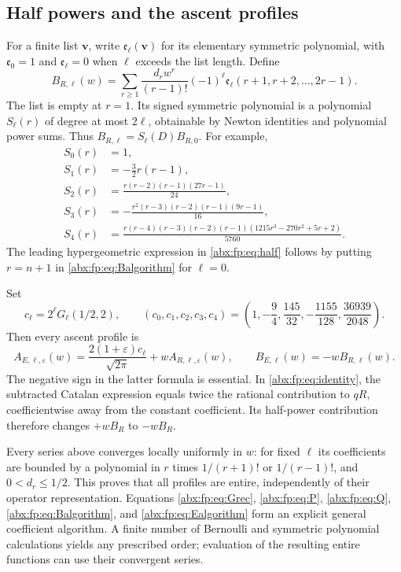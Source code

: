 \documentclass[11pt,letterpaper]{article}
\numberwithin{equation}{section}
\theoremstyle{remark}\newtheorem{remark}[theorem]{Remark}
\newcommand{\eps}{\varepsilon}
\newcommand{\sq}{\sqrt{2\pi}}
\begin{document}
\subsection{Half powers and the ascent profiles}\label{abx:fp:sub:half}
For a finite list $\boldsymbol v$, write $\mathfrak e_\ell(\boldsymbol v)$
for its elementary symmetric polynomial, with $\mathfrak e_0=1$ and
$\mathfrak e_\ell=0$ when $\ell$ exceeds the list length. Define
\begin{equation}\label{abx:fp:eq:Balgorithm}
 B_{R,\ell}(w)=\sum_{r\ge1}\frac{d_rw^r}{(r-1)!}
       (-1)^\ell\mathfrak e_\ell(r+1,r+2,\ldots,2r-1).
\end{equation}
The list is empty at $r=1$. Its signed symmetric polynomial is a
polynomial $S_\ell(r)$ of degree at most $2\ell$, obtainable by
Newton identities and polynomial power sums. Thus
$B_{R,\ell}=S_\ell(D)B_{R,0}$. For example,
\begin{align*}
 S_0(r)&=1,\\
 S_1(r)&=-\frac32r(r-1),\\
 S_2(r)&=\frac{r(r-2)(r-1)(27r-1)}{24},\\
 S_3(r)&=-\frac{r^2(r-3)(r-2)(r-1)(9r-1)}{16},\\
 S_4(r)&=\frac{r(r-4)(r-3)(r-2)(r-1)
                  (1215r^3-270r^2+5r+2)}{5760}.
\end{align*}
The leading hypergeometric expression in \eqref{abx:fp:eq:half} follows by
putting $r=n+1$ in \eqref{abx:fp:eq:Balgorithm} for $\ell=0$.

Set
\begin{equation}\label{abx:fp:eq:c}
 c_\ell=2^\ell G_\ell(1/2,2),\qquad
 (c_0,c_1,c_2,c_3,c_4)=
 \left(1,-\frac94,\frac{145}{32},-\frac{1155}{128},
                              \frac{36939}{2048}\right).
\end{equation}
Then every ascent profile is
\begin{equation}\label{abx:fp:eq:Ealgorithm}
 A_{E,\ell,\eps}(w)=\frac{2(1+\eps)c_\ell}{\sq}
                         +wA_{R,\ell,\eps}(w),\qquad
 B_{E,\ell}(w)=-wB_{R,\ell}(w).
\end{equation}
The negative sign in the latter formula is essential. In
\eqref{abx:fp:eq:identity}, the subtracted Catalan expression equals twice
the rational contribution to $qR$, coefficientwise away from the
constant coefficient. Its half-power contribution therefore changes
$+wB_R$ to $-wB_R$.

Every series above converges locally uniformly in $w$: for fixed
$\ell$ its coefficients are bounded by a polynomial in $r$ times
$1/(r+1)!$ or $1/(r-1)!$, and $0<d_r\le1/2$.
This proves that all profiles are entire, independently of their
operator representation. Equations \eqref{abx:fp:eq:Grec}, \eqref{abx:fp:eq:P},
\eqref{abx:fp:eq:Q}, \eqref{abx:fp:eq:Balgorithm}, and \eqref{abx:fp:eq:Ealgorithm} form
an explicit general coefficient algorithm. A finite number of
Bernoulli and symmetric polynomial calculations yields any prescribed
order; evaluation of the resulting entire functions can use their
convergent series.
\end{document}
